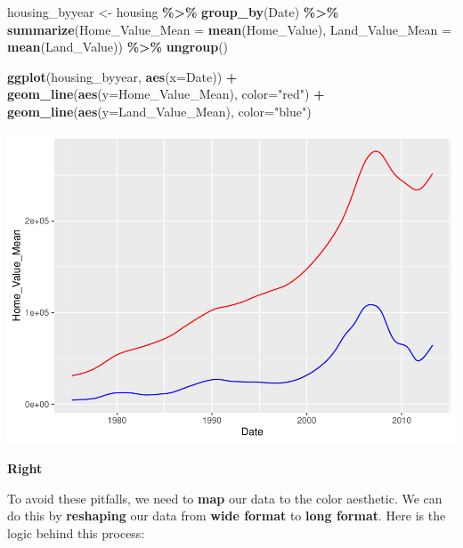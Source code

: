 \documentclass[
]{book}
\newenvironment{Shaded}{\begin{snugshade}}{\end{snugshade}}
\newcommand{\DataTypeTok}[1]{\textcolor[rgb]{0.13,0.29,0.53}{#1}}
\newcommand{\KeywordTok}[1]{\textcolor[rgb]{0.13,0.29,0.53}{\textbf{#1}}}
\newcommand{\NormalTok}[1]{#1}
\newcommand{\OperatorTok}[1]{\textcolor[rgb]{0.81,0.36,0.00}{\textbf{#1}}}
\newcommand{\StringTok}[1]{\textcolor[rgb]{0.31,0.60,0.02}{#1}}
\begin{document}
\begin{Shaded}
\begin{Highlighting}[]
\NormalTok{housing\_byyear \textless{}{-}}\StringTok{ }
\StringTok{  }\NormalTok{housing }\OperatorTok{\%\textgreater{}\%}
\StringTok{  }\KeywordTok{group\_by}\NormalTok{(Date) }\OperatorTok{\%\textgreater{}\%}
\StringTok{  }\KeywordTok{summarize}\NormalTok{(}\DataTypeTok{Home\_Value\_Mean =} \KeywordTok{mean}\NormalTok{(Home\_Value),}
            \DataTypeTok{Land\_Value\_Mean =} \KeywordTok{mean}\NormalTok{(Land\_Value)) }\OperatorTok{\%\textgreater{}\%}
\StringTok{  }\KeywordTok{ungroup}\NormalTok{()}

\KeywordTok{ggplot}\NormalTok{(housing\_byyear, }\KeywordTok{aes}\NormalTok{(}\DataTypeTok{x=}\NormalTok{Date)) }\OperatorTok{+}
\StringTok{  }\KeywordTok{geom\_line}\NormalTok{(}\KeywordTok{aes}\NormalTok{(}\DataTypeTok{y=}\NormalTok{Home\_Value\_Mean), }\DataTypeTok{color=}\StringTok{"red"}\NormalTok{) }\OperatorTok{+}
\StringTok{  }\KeywordTok{geom\_line}\NormalTok{(}\KeywordTok{aes}\NormalTok{(}\DataTypeTok{y=}\NormalTok{Land\_Value\_Mean), }\DataTypeTok{color=}\StringTok{"blue"}\NormalTok{)}
\end{Highlighting}
\end{Shaded}

\includegraphics{R/Rgraphics/figures/unnamed-chunk-213-1.pdf}

\textbf{Right}

To avoid these pitfalls, we need to \textbf{map} our data to the color aesthetic.
We can do this by \textbf{reshaping} our data from \textbf{wide format} to \textbf{long format}.
Here is the logic behind this process:
\end{document}
